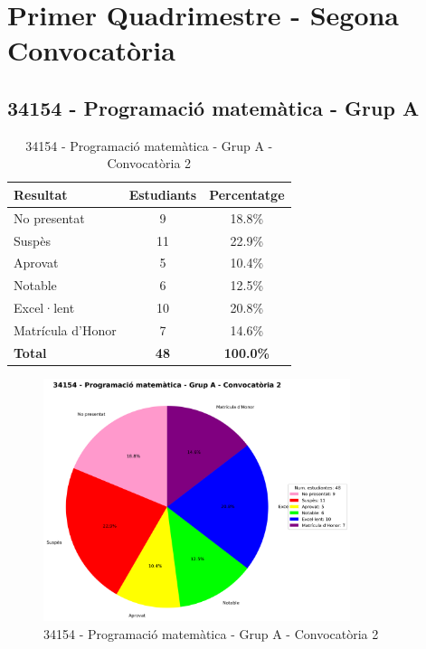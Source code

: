 \documentclass[12pt,a4paper]{article}
\begin{document}
\newpage


\section{Primer Quadrimestre - Segona Convocatòria}


\subsection{34154 - Programació matemàtica - Grup A}


\begin{table}[H]
\centering
\caption{34154 - Programació matemàtica - Grup A - Convocatòria 2}
\begin{tabular}{|l|c|c|}
\hline
\textbf{Resultat} & \textbf{Estudiants} & \textbf{Percentatge} \\
\hline
No presentat & 9 & 18.8\% \\
Suspès & 11 & 22.9\% \\
Aprovat & 5 & 10.4\% \\
Notable & 6 & 12.5\% \\
Excel·lent & 10 & 20.8\% \\
Matrícula d'Honor & 7 & 14.6\% \\
\hline
\textbf{Total} & \textbf{48} & \textbf{100.0\%} \\
\hline
\end{tabular}
\end{table}

\begin{figure}[H]
\centering
\includegraphics[width=0.8\textwidth]{graficos/34154_A_1Q2.png}
\caption{34154 - Programació matemàtica - Grup A - Convocatòria 2}
\end{figure}
\end{document}
